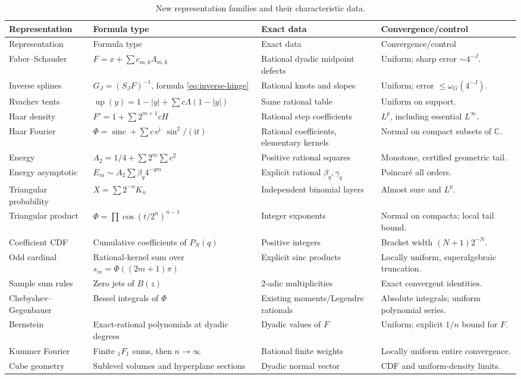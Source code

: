 \documentclass[11pt,oneside]{article}
\theoremstyle{definition}
\theoremstyle{remark}
\newcommand{\C}{\mathbb C}
\newcommand{\Up}{\operatorname{up}}
\newcommand{\sinc}{\operatorname{sinc}}
\newcommand{\ii}{\mathrm i}
\newcommand{\e}{\mathrm e}
\newcommand{\1}{\mathbf 1}
\begin{document}
\begingroup\small
\begin{longtable}{@{}>{\raggedright\arraybackslash}p{}>{\raggedright\arraybackslash}p{}>{\raggedright\arraybackslash}p{}>{\raggedright\arraybackslash}p{}@{}}
\caption{New representation families and their characteristic data.}\label{tab:new-synthesis}\\
\toprule
Representation & Formula type & Exact data & Convergence/control \\
\midrule
\endfirsthead
\toprule
Representation & Formula type & Exact data & Convergence/control \\
\midrule
\endhead
Faber--Schauder & $F=x+\sum c_{m,k}\Lambda_{m,k}$ & Rational dyadic midpoint defects & Uniform; sharp error $\sim4^{-J}$.\\
Inverse splines & $G_J=(S_JF)^{-1}$, formula \eqref{eq:inverse-hinge} & Rational knots and slopes & Uniform; error $\le\omega_G(4^{-J})$.\\
Rvachev tents & $\Up(y)=1-|y|+\sum c\Lambda(1-|y|)$ & Same rational table & Uniform on support.\\
Haar density & $F'=1+\sum2^{m+1}cH$ & Rational step coefficients & $L^p$, including essential $L^\infty$.\\
Haar Fourier & $\Phi=\sinc+\sum c\,\e^{\ii\cdot}\sin^2/(\ii t)$ & Rational coefficients, elementary kernels & Normal on compact subsets of $\C$.\\
Energy & $A_2=1/4+\sum2^m\sum c^2$ & Positive rational squares & Monotone, certified geometric tail.\\
Energy asymptotic & $E_m\sim A_2\sum\beta_q4^{-qm}$ & Explicit rational $\beta_q,\gamma_q$ & Poincaré all orders.\\
Triangular probability & $X=\sum2^{-n}K_n$ & Independent binomial layers & Almost sure and $L^p$.\\
Triangular product & $\Phi=\prod\cos(t/2^n)^{n-1}$ & Integer exponents & Normal on compacta; local tail bound.\\
Coefficient CDF & Cumulative coefficients of $P_N(q)$ & Positive integers & Bracket width $(N+1)2^{-N}$.\\
Odd cardinal & Rational-kernel sum over $s_m=\Phi((2m+1)\pi)$ & Explicit sinc products & Locally uniform, superalgebraic truncation.\\
Sample sum rules & Zero jets of $B(z)$ & $2$-adic multiplicities & Exact convergent identities.\\
Chebyshev--\newline Gegenbauer & Bessel integrals of $\Phi$ & Existing moments/Legendre rationals & Absolute integrals; uniform polynomial series.\\
Bernstein & Exact-rational polynomials at dyadic degrees & Dyadic values of $F$ & Uniform; explicit $1/n$ bound for $F$.\\
Kummer Fourier & Finite ${}_1F_1$ sums, then $n\to\infty$ & Rational finite weights & Locally uniform entire convergence.\\
Cube geometry & Sublevel volumes and hyperplane sections & Dyadic normal vector & CDF and uniform-density limits.\\
\bottomrule
\end{longtable}
\endgroup
\end{document}
